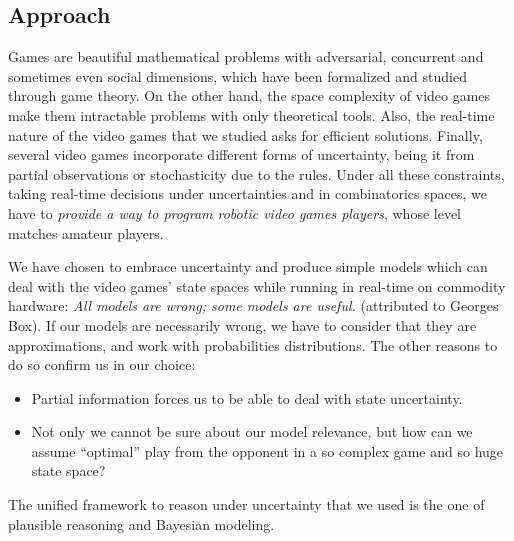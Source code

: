 
\subsection{Approach}
Games are beautiful mathematical problems with adversarial, concurrent and sometimes even social dimensions, which have been formalized and studied through game theory. %
On the other hand, the space complexity of video games make them intractable problems with only theoretical tools. Also, the real-time nature of the video games that we studied asks for efficient solutions. Finally, several video games incorporate different forms of uncertainty, being it from partial observations or stochasticity due to the rules. Under all these constraints, taking real-time decisions under uncertainties and in combinatorics spaces, we have to \textit{provide a way to program robotic video games players}, whose level matches amateur players.

We have chosen to embrace uncertainty and produce simple models which can deal with the video games' state spaces while running in real-time on commodity hardware: \textit{All models are wrong; some models are useful.} (attributed to Georges Box). If our models are necessarily wrong, we have to consider that they are approximations, and work with probabilities distributions. The other reasons to do so confirm us in our choice:
\begin{itemize}
    \item Partial information forces us to be able to deal with state uncertainty. 
    \item Not only we cannot be sure about our model relevance, but how can we assume ``optimal'' play from the opponent in a so complex game and so huge state space?
\end{itemize}
The unified framework to reason under uncertainty that we used is the one of plausible reasoning and Bayesian modeling.

